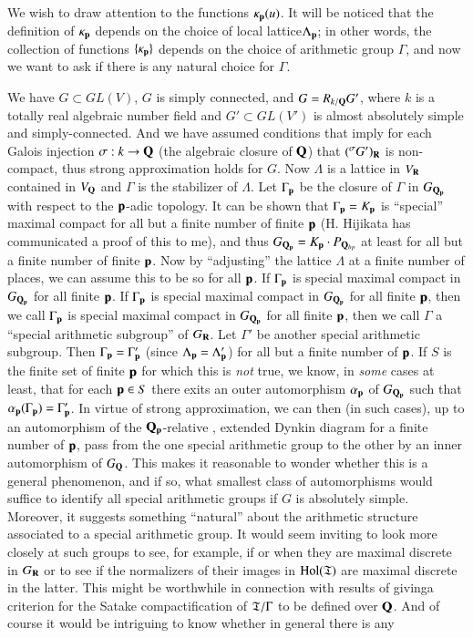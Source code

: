 We wish to draw attention to the functions $\kappa_{\mathbf{p}} (u)$. It will be noticed that the definition of $\kappa_{\mathbf{p}}$ depends on the choice of local lattice\pageoriginale  $\Lambda_{\mathbf{p}}$; in other words, the collection of functions $\{\kappa_{\mathbf{p}}\}$ depends on the choice of arithmetic group $\Gamma$, and now we want to ask if there is any natural choice for $\Gamma$.

We have $G \subset G L (V)$, $G$ is simply connected, and $G = R_{k/\mathbf{Q}} G'$, where $k$ is a totally real algebraic number field and $G' \subset G L (V')$ is almost absolutely simple and simply-connected. And we have assumed conditions that imply for each Galois injection $\sigma : k \to \mathbf{Q}$ (the algebraic closure of $\mathbf{Q}$) that $({}^{\sigma} G')_{\mathbf{R}}$ is non-compact, thus strong approximation holds for $G$. Now $\Lambda$ is a lattice in $V_{\mathbf{R}}$ contained in $V_{\mathbf{Q}}$ and $\Gamma$ is the stabilizer of $\Lambda$. Let $\Gamma_{\mathbf{p}}$ be the closure of $\Gamma$ in $G_{\mathbf{Q}_{\mathbf{p}}}$ with respect to the $\mathbf{p}$-adic topology. It can be shown that $\Gamma_{\mathbf{p}}= K_{\mathbf{p}}$ is ``special'' maximal compact \cite{art1-key5,art1-key9} for all but a finite number of finite $\mathbf{p}$ (H. Hijikata has communicated a proof of this to me), and thus $G_{\mathbf{Q}_{\mathbf{p}}} = K_{\mathbf{p}} \cdot P_{\mathbf{Q}_{bp}}$ at least for all but a finite number of finite $\mathbf{p}$. Now by ``adjusting'' the lattice $\Lambda$ at a finite number of places, we can assume this to be so for all $\mathbf{p}$. If $\Gamma_{\mathbf{p}}$ is special maximal compact in $G_{\mathbf{Q}_{\mathbf{p}}}$ for all finite $\mathbf{p}$. If $\Gamma_{\mathbf{p}}$ is special maximal compact in $G_{\mathbf{Q}_{\mathbf{p}}}$ for all finite $\mathbf{p}$, then we call $\Gamma_{\mathbf{p}}$ is special maximal compact in $G_{\mathbf{Q}_{\mathbf{p}}}$ for all finite $\mathbf{p}$, then we call $\Gamma$ a ``special arithmetic subgroup'' of $G_{\mathbf{R}}$. Let $\Gamma'$ be another special arithmetic subgroup. Then $\Gamma_{\mathbf{p}}=\Gamma'_{\mathbf{p}}$ (since $\Lambda_{\mathbf{p}} = \Lambda'_{\mathbf{p}}$) for all but a finite number of $\mathbf{p}$. If $S$ is the finite set of finite $\mathbf{p}$ for which this is {\it not} true, we know, in {\it some} cases at least, that for each $\mathbf{p} \in S$ there exits an outer automorphism $\alpha_{\mathbf{p}}$ of $G_{\mathbf{Q}_{\mathbf{p}}}$ such that $\alpha_{\mathbf{p}} (\Gamma_{\mathbf{p}}) = \Gamma'_{\mathbf{p}}$. In virtue of strong approximation, we can then (in such cases), up to an automorphism of the $\mathbf{Q}_{\mathbf{p}}$-relative , extended Dynkin diagram for a finite number of $\mathbf{p}$, pass from the one special arithmetic group to the other by an inner automorphism of $G_{\mathbf{Q}}$. This makes it reasonable to wonder whether this is a general phenomenon, and if so, what smallest class of automorphisms would suffice to identify all special arithmetic groups if $G$ is absolutely simple. Moreover, it suggests something ``natural'' about the arithmetic structure associated to a special arithmetic group. It would seem inviting to look more closely at such groups to see, for example, if or when they are maximal discrete in $G_{\mathbf{R}}$ or to see if the normalizers of their images in $\operatorname{Hol}(\mathfrak{T})$ are maximal discrete in the latter. This might be worthwhile in connection with results of \cite{art1-key1} giving\pageoriginale a criterion for the Satake compactification of $\mathfrak{T}/\Gamma$ to be defined over $\mathbf{Q}$. And of course it would be intriguing to know whether in general there is any 